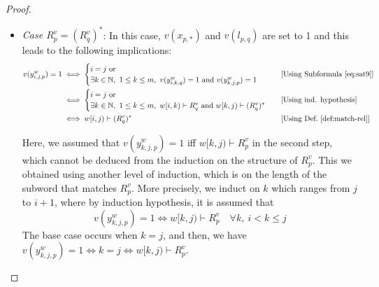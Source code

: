 \begin{proof}
\begin{itemize}[label=$-$]
    \item \textit{Case $R^v_p=(R^v_q)^{*}$}: In this case, $v(x_{p,*})$ and $v(l_{p,q})$ are set to 1 and this leads to the following implications:
     \begin{align*}
    v(y^w_{i,j,p})=1 &\iff 
    \begin{cases} 
    i=j \text{ or}\\ 
    \exists k\in \mathbb N,\ 1\leq k\leq m,\ v(y^w_{i,k,q})=1 \text{ and }v(y^w_{k,j,p})=1
    \end{cases} &&\text{[Using Subformula~\eqref{eq:sat9}]}\\
    &\iff     
    \begin{cases} 
    i=j \text{ or}\\ 
    \exists k\in \mathbb N,\ 1\leq k\leq m,\ w[i,k)\vdash R^v_q \text{ and }w[k,j)\vdash (R^v_{q})^*
    \end{cases}&&\text{[Using ind. hypothesis]}\\
    &\iff w[i,j)\vdash (R^v_q)^*&&\text{[Using Def.~\ref{def:match-rel}]}
    \end{align*}
    
    Here, we assumed that $v(y^w_{k,j,p})=1$ iff $w[k,j)\vdash R^v_{p}$ in the second step, which cannot be deduced from the induction on the structure of $R^v_p$. This we obtained using another level of induction, which is on the length of the subword that matches $R^v_{p}$. More precisely, we induct on $k$ which ranges from $j$ to $i+1$, where by induction hypothesis, it is assumed that 
    $$v(y^w_{k,j,p})=1 \iff w[k,j)\vdash R^v_{p}\quad \forall k,\ i<k\leq j$$
    The base case occurs when $k=j$, and then, we have 
    ${v(y^w_{k,j,p})=1 \iff k=j  \iff w[k,j)\vdash R^v_{p}}$.

    
\end{itemize}

\end{proof}